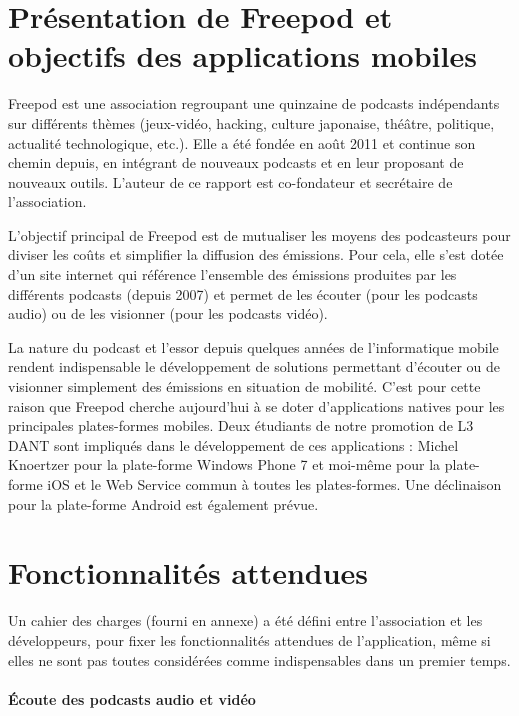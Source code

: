 \documentclass[11pt, french]{report}
\begin{document}
\section{Présentation de Freepod et objectifs des applications mobiles}

Freepod est une association regroupant une quinzaine de podcasts indépendants sur différents thèmes (jeux-vidéo, hacking, culture japonaise, théâtre, politique, actualité technologique, etc.). Elle a été fondée en août 2011 et continue son chemin depuis, en intégrant de nouveaux podcasts et en leur proposant de nouveaux outils. L’auteur de ce rapport est co-fondateur et secrétaire de l’association.

L’objectif principal de Freepod est de mutualiser les moyens des podcasteurs pour diviser les coûts et simplifier la diffusion des émissions.
Pour cela, elle s’est dotée d’un site internet qui référence l’ensemble des émissions produites par les différents podcasts (depuis 2007) et permet de les écouter (pour les podcasts audio) ou de les visionner (pour les podcasts vidéo).

La nature du podcast et l'essor depuis quelques années de l’informatique mobile rendent indispensable le développement de solutions permettant d’écouter ou de visionner simplement des émissions en situation de mobilité. C’est pour cette raison que Freepod cherche aujourd’hui à se doter d’applications natives pour les principales plates-formes mobiles. 
Deux étudiants de notre promotion de L3 DANT sont impliqués dans le développement de ces applications : Michel Knoertzer pour la plate-forme Windows Phone 7 et moi-même pour la plate-forme iOS et le Web Service commun à toutes les plates-formes. Une déclinaison pour la plate-forme Android est également prévue.

\section{Fonctionnalités attendues}

Un cahier des charges (fourni en annexe) a été défini entre l’association et les développeurs, pour fixer les fonctionnalités attendues de l’application, même si elles ne sont pas toutes considérées comme indispensables dans un premier temps.

\paragraph{Écoute des podcasts audio et vidéo}
\end{document}
